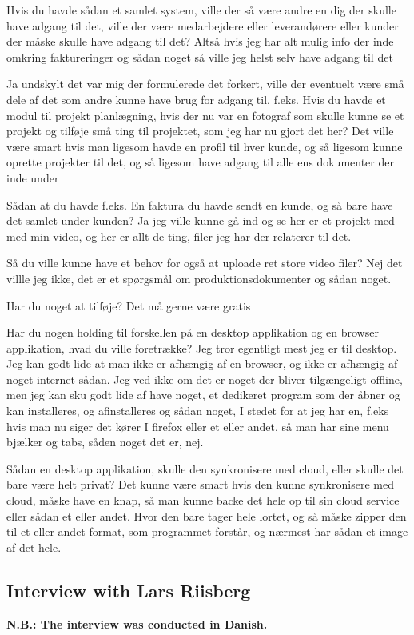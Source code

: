 Hvis du havde sådan et samlet system, ville der så være andre en dig der skulle have adgang til det, ville der være medarbejdere eller leverandørere eller kunder der måske skulle have adgang til det?
Altså hvis jeg har alt mulig info der inde omkring faktureringer og sådan noget så ville jeg helst selv have adgang til det

Ja undskylt det var mig der formulerede det forkert, ville der eventuelt være små dele af det som andre kunne have brug for adgang til, f.eks. Hvis du havde et modul til projekt planlægning, hvis der nu var en fotograf som skulle kunne se et projekt og tilføje små ting til projektet, som jeg har nu gjort det her?
Det ville være smart hvis man ligesom havde en profil til hver kunde, og så ligesom kunne oprette projekter til det, og så ligesom have adgang til alle ens dokumenter der inde under

Sådan at du havde f.eks. En faktura du havde sendt en kunde, og så bare have det samlet under kunden?
Ja jeg ville kunne gå ind og se her er et projekt med med min video, og her er allt de ting, filer jeg har der relaterer til det.

Så du ville kunne have et behov for også at uploade ret store video filer?
Nej det villle jeg ikke, det er et spørgsmål om produktionsdokumenter og sådan noget.

Har du noget at tilføje?
Det må gerne være gratis

Har du nogen holding til forskellen på en desktop applikation og en browser applikation, hvad du ville foretrække?
Jeg tror egentligt mest jeg er til desktop. Jeg kan godt lide at man ikke er afhængig af en browser, og ikke er afhængig af noget internet sådan. Jeg ved ikke om det er noget der bliver tilgængeligt offline, men jeg kan sku godt lide af have noget, et dedikeret program som der åbner og kan installeres, og afinstalleres og sådan noget, I stedet for at jeg har en, f.eks hvis man nu siger det kører I firefox eller et eller andet, så man har sine menu bjælker og tabs, såden noget det er, nej.

Sådan en desktop applikation, skulle den synkronisere med cloud, eller skulle det bare være helt privat?
Det kunne være smart hvis den kunne synkronisere med cloud, måske have en knap, så man kunne backe det hele op til sin cloud service eller sådan et eller andet. Hvor den bare tager hele lortet, og så måske zipper den til et eller andet format, som programmet forstår, og nærmest har sådan et image af det hele.


\subsection{Interview with Lars Riisberg}
\textbf{N.B.: The interview was conducted in Danish.}


